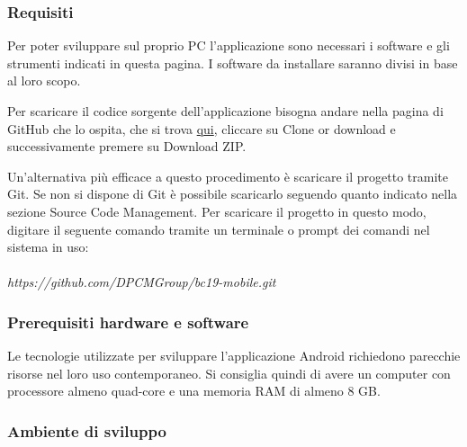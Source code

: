\subsubsection{Requisiti}
Per poter sviluppare sul proprio PC l'applicazione sono necessari i software e gli strumenti indicati in questa pagina. I software da installare saranno divisi in base al loro scopo.

Per scaricare il codice sorgente dell'applicazione bisogna andare nella pagina di GitHub che lo ospita, che si trova \href{https://github.com/DPCMGroup/bc19-mobile}{qui}, cliccare su Clone or download e successivamente premere su Download ZIP.

Un'alternativa più efficace a questo procedimento è scaricare il progetto tramite Git. Se non si dispone di Git è possibile scaricarlo seguendo quanto indicato nella sezione Source Code Management. Per scaricare il progetto in questo modo, digitare il seguente comando tramite un terminale o prompt dei comandi nel sistema in uso:\\ \\
\textit{https://github.com/DPCMGroup/bc19-mobile.git}

\subsubsection{Prerequisiti hardware e software}
Le tecnologie utilizzate per sviluppare l'applicazione Android richiedono parecchie risorse nel loro uso contemporaneo. Si consiglia quindi di avere un computer con processore almeno quad-core e una memoria RAM di almeno 8 GB.

\subsubsection{Ambiente di sviluppo}

